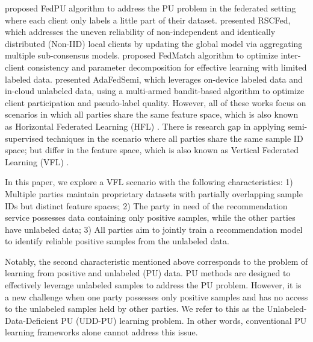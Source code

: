 \documentclass[10pt,journal,compsoc]{IEEEtran}
\begin{document}
\citet{lin2022federated} proposed FedPU algorithm to address the PU problem in the federated setting where each client only labels a little part of their dataset. \citet{liang2022rscfed} presented RSCFed, which addresses the uneven reliability of non-independent and identically distributed (Non-IID) local clients by updating the global model via aggregating multiple sub-consensus models. \citet{jeong2020federated} proposed FedMatch algorithm to optimize inter-client consistency and parameter decomposition for effective learning with limited labeled data. \citet{wang2022enhancing} presented AdaFedSemi, which leverages on-device labeled data and in-cloud unlabeled data, using a multi-armed bandit-based algorithm to optimize client participation and pseudo-label quality. However, all of these works focus on scenarios in which all parties share the same feature space, which is also known as Horizontal Federated Learning (HFL) \cite{yang2019federated}. There is research gap in applying semi-supervised techniques in the scenario where all parties share the same sample ID space; but differ in the feature space, which is also known as Vertical Federated Learning (VFL) \cite{yang2019federated}.

In this paper, we explore a VFL scenario with the following characteristics: 1) Multiple parties maintain proprietary datasets with partially overlapping sample IDs but distinct feature spaces; 2) The party in need of the recommendation service possesses data containing only positive samples, while the other parties have unlabeled data; 3) All parties aim to jointly train a recommendation model to identify reliable positive samples from the unlabeled data.

Notably, the second characteristic mentioned above corresponds to the problem of learning from positive and unlabeled (PU) data. PU methods \cite{mordelet2014bagging,liu2003building,liu2015classification,xu2017multi} are designed to effectively leverage unlabeled samples to address  the PU problem. However, it is a new challenge when one party possesses only positive samples and has no access to the unlabeled samples held by other parties. We refer to this as the Unlabeled-Data-Deficient PU (UDD-PU) learning problem. In other words, conventional PU learning frameworks alone cannot address this issue.
\end{document}
